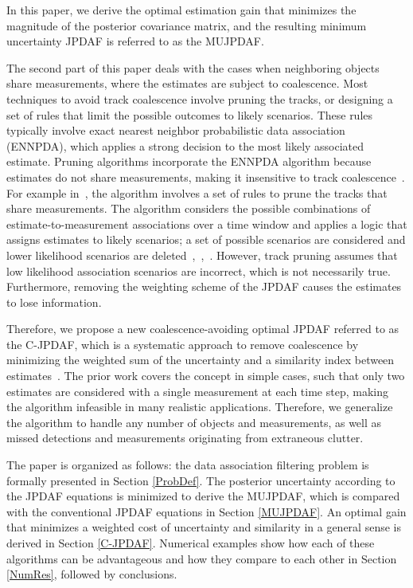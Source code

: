 \documentclass[letterpaper, 10pt, conference]{ieeeconf}
\begin{document}
In this paper, we derive the optimal estimation gain that minimizes the magnitude of the posterior covariance matrix, and the resulting minimum uncertainty JPDAF is referred to as the MUJPDAF.

The second part of this paper deals with the cases when neighboring objects share measurements, where the estimates are subject to coalescence.
Most techniques to avoid track coalescence involve pruning the tracks, or designing a set of rules that limit the possible outcomes to likely scenarios. These rules typically involve exact nearest neighbor probabilistic data association (ENNPDA), which applies a strong decision to the most likely associated estimate. Pruning algorithms incorporate the ENNPDA algorithm because  estimates do not share measurements, making it insensitive to track coalescence~\cite{Coal1}.
For example in~\cite{Fitzgerald}, the algorithm involves a set of rules to prune the tracks that share measurements.
The algorithm considers the possible combinations of estimate-to-measurement associations over a time window and applies a logic that assigns estimates to likely scenarios; a set of possible scenarios are considered and lower likelihood scenarios are deleted~\cite{Coal_d},~\cite{Coal_e},~\cite{Coal_c}.
However, track pruning assumes that low likelihood association scenarios are incorrect, which is not necessarily true.
Furthermore, removing the weighting scheme of the JPDAF causes the estimates to lose information.

Therefore, we propose a new coalescence-avoiding optimal JPDAF referred to as the C-JPDAF, which is a systematic approach to remove coalescence by minimizing the weighted sum of the uncertainty and a similarity index between estimates~\cite{KauLovLee14}.
The prior work covers the concept in simple cases, such that only two estimates are considered with a single measurement at each time step, making the algorithm infeasible in many realistic applications.
Therefore, we generalize the algorithm to handle any number of objects and measurements, as well as missed detections and measurements originating from extraneous clutter.

The paper is organized as follows: the data association filtering problem is formally presented in Section \ref{ProbDef}.
The posterior uncertainty according to the JPDAF equations is minimized to derive the MUJPDAF, which is compared with the conventional JPDAF equations in Section \ref{MUJPDAF}.
An optimal gain that minimizes a weighted cost of uncertainty and similarity in a general sense is derived in Section \ref{C-JPDAF}.
Numerical examples show how each of these algorithms can be advantageous and how they compare to each other in Section \ref{NumRes}, followed by conclusions.
\end{document}
